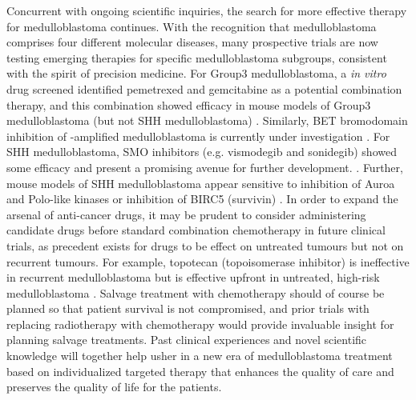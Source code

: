 Concurrent with ongoing scientific inquiries, the search for more effective therapy for medulloblastoma continues. With the recognition that medulloblastoma comprises four different molecular diseases, many prospective trials are now testing emerging therapies for specific medulloblastoma subgroups, consistent with the spirit of precision medicine. For Group3 medulloblastoma, a \emph{in vitro} drug screened identified  pemetrexed and gemcitabine as a potential combination therapy, and this combination showed efficacy in mouse models of Group3 medulloblastoma (but not SHH medulloblastoma) . Similarly, BET bromodomain inhibition of -amplified medulloblastoma is currently under investigation . For SHH medulloblastoma, SMO inhibitors (e.g. vismodegib and sonidegib) showed some efficacy and present a promising avenue for further development. . Further, mouse models of SHH medulloblastoma appear sensitive to inhibition of Auroa and Polo-like kinases  or inhibition of BIRC5 (survivin) . In order to expand the arsenal of anti-cancer drugs, it may be prudent to consider administering candidate drugs before standard combination chemotherapy in future clinical trials, as precedent exists for drugs to be effect on untreated tumours but not on recurrent tumours. For example, topotecan (topoisomerase inhibitor) is ineffective in recurrent medulloblastoma  but is effective upfront in untreated, high-risk medulloblastoma . Salvage treatment with chemotherapy should of course be planned so that patient survival is not compromised, and prior trials with replacing radiotherapy with chemotherapy would provide invaluable insight for planning salvage treatments. Past clinical experiences and novel scientific knowledge will together help usher in a new era of medulloblastoma treatment based on individualized targeted therapy that enhances the quality of care and preserves the quality of life for the patients.


